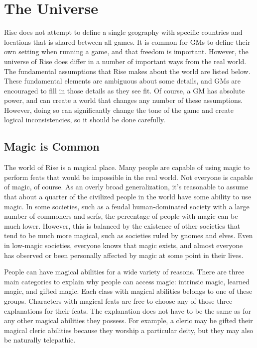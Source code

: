 \chapter{The Universe}

    Rise does not attempt to define a single geography with specific countries and locations that is shared between all games.
    It is common for GMs to define their own setting when running a game, and that freedom is important.
    However, the universe of Rise does differ in a number of important ways from the real world.
    The fundamental assumptions that Rise makes about the world are listed below.
    These fundamental elements are ambiguous about some details, and GMs are encouraged to fill in those details as they see fit.
    Of course, a GM has absolute power, and can create a world that changes any number of these assumptions.
    However, doing so can significantly change the tone of the game and create logical inconsistencies, so it should be done carefully.

\section{Magic is Common}
    The world of Rise is a magical place.
    Many people are capable of using magic to perform feats that would be impossible in the real world.
    Not everyone is capable of magic, of course.
    As an overly broad generalization, it's reasonable to assume that about a quarter of the civilized people in the world have some ability to use magic.
    In some societies, such as a feudal human-dominated society with a large number of commoners and serfs, the percentage of people with magic can be much lower.
    However, this is balanced by the existence of other societies that tend to be much more magical, such as societies ruled by gnomes and elves.
    Even in low-magic societies, everyone knows that magic exists, and almost everyone has observed or been personally affected by magic at some point in their lives.

    People can have magical abilities for a wide variety of reasons.
    There are three main categories to explain why people can access magic: intrinsic magic, learned magic, and gifted magic.
    Each class with magical abilities belongs to one of these groups.
    Characters with magical feats are free to choose any of those three explanations for their feats.
    The explanation does not have to be the same as for any other magical abilities they possess.
    For example, a cleric may be gifted their magical cleric abilities because they worship a particular deity, but they may also be naturally telepathic.

